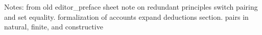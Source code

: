 
Notes: from old editor_preface sheet
note on redundant principles
switch pairing and set equality.
formalization of accounts
expand deductions section.
pairs in natural, finite, and constructive
